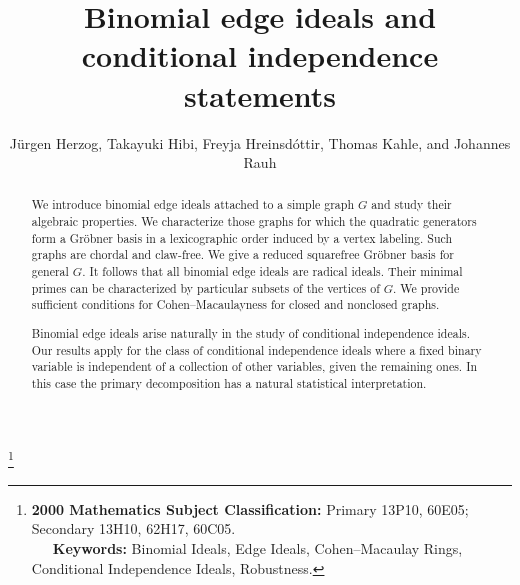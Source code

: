\documentclass[11pt]{amsart}
\begin{document}
\title{Binomial edge ideals and conditional independence statements}

\author{J\"urgen Herzog, Takayuki Hibi, Freyja Hreinsd\'{o}ttir, Thomas Kahle, and Johannes Rauh}
\thanks{
{\bf 2000 Mathematics Subject Classification:}
Primary 13P10, 60E05; Secondary 13H10, 62H17, 60C05. \\
%
\, \, \, {\bf Keywords:}
Binomial Ideals, Edge Ideals, Cohen--Macaulay Rings, Conditional
Independence Ideals, Robustness.
}


\address{J\"urgen Herzog, Fachbereich Mathematik, Universit\"at Duisburg--Essen, Campus Essen, 45117
Essen, Germany} 

\address{Takayuki Hibi, Department of Pure and Applied Mathematics, Graduate School of Information Science and Technology,
Osaka University, Toyonaka, Osaka 560-0043, Japan}


\address{Freyja Hreinsd\'{o}ttir,   School of Education, University of Iceland, Stakkahlid, 105 Reykjavik, Iceland}

\address{Thomas Kahle and Johannes Rauh, MPI for Mathematics in the Sciences, 04103, Leipzig, Germany}


\begin{abstract}
  We introduce binomial edge ideals attached to a simple graph $G$ and study their algebraic properties.  We
  characterize those graphs for which the quadratic generators form a Gr\"obner basis in a lexicographic order induced
  by a vertex labeling. Such graphs are chordal and claw-free.  We give a reduced squarefree Gr\"obner basis for general
  $G$. It follows that all binomial edge ideals are radical ideals. Their minimal primes can be characterized by
  particular subsets of the vertices of $G$.  We provide sufficient conditions for Cohen--Macaulayness for closed and
  nonclosed graphs.

  Binomial edge ideals arise naturally in the study of conditional independence ideals.  Our results apply for the class
  of conditional independence ideals where a fixed binary variable is independent of a collection of other variables,
  given the remaining ones.  In this case the primary decomposition has a natural statistical interpretation.
%
\end{abstract}
\end{document}
